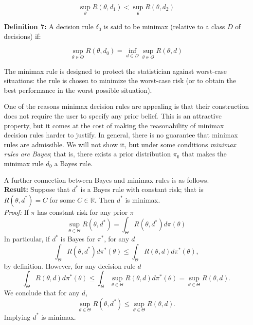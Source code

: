 \documentclass[11pt]{article} %
\begin{document}
\[ \sup_{\theta} R(\theta, d_1) < \sup_{\theta} R(\theta, d_2) \]

\noindent \textbf{Definition 7:} A decision rule $\delta_0$ is said to be minimax (relative to a class $D$ of decisions) if:

\[ \sup_{\theta \in \Theta} R(\theta, d_0) = \inf_{d \in D} \sup_{\theta \in \Theta} R(\theta, d) \] 

The minimax rule is designed to protect the statistician against worst-case situations: the rule is chosen to minimize the worst-case risk (or to obtain the best performance in the worst possible situation). 

One of the reasons minimax decision rules are appealing is that their construction does not require the user to specify any prior belief. This is an attractive property, but it comes at the cost of making the reasonability of minimax decision rules harder to justify. In general, there is no guarantee that minimax rules are admissible. We will not show it, but under some conditions \emph{minimax rules are Bayes}; that is, there exists a prior distribution $\pi_0$ that makes the minimax rule $d_0$ a Bayes rule. 

A further connection between Bayes and minimax rules is as follows. \\

\noindent \textbf{Result:} Suppose that $d^*$ is a Bayes rule with constant risk; that is $R(\theta, d^*)= C$ for some $C \in \mathbb{R}$. Then $d^*$ is minimax. \\

\noindent \emph{Proof:} If $\pi$ has constant risk for any prior $\pi$
\[ \sup_{\theta \in \Theta} R(\theta, d^*) = \int_{\Theta} R(\theta, d^*) d \pi(\theta)   \]
 In particular, if $d^*$ is Bayes for $\pi^*$, for any $d$
 \[  \int_{\Theta} R(\theta, d^*) d \pi^*(\theta) \leq \int_{\Theta} R(\theta, d) d \pi^*(\theta),    \]
by definition. However, for any decision rule $d$
 \[  \int_{\Theta} R(\theta, d) d \pi^*(\theta) \leq \int_{\Theta} \sup_{\theta \in \Theta} R(\theta, d) d \pi^*(\theta) = \sup_{\theta \in \Theta} R(\theta,d).    \]
 We conclude that for any $d$,
 \[\sup_{\theta \in \Theta} R(\theta, d^*) \leq  \sup_{\theta \in \Theta} R(\theta,d).  \]
Implying $d^*$ is minimax. 



\newpage 



\end{document}
